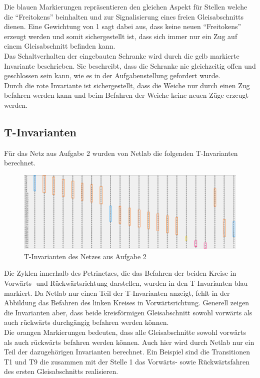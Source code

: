 \documentclass[10pt]{scrartcl}
\begin{document}
Die blauen Markierungen repräsentieren den gleichen Aspekt für Stellen welche die "`Freitokens"' beinhalten und zur Signalisierung eines freien Gleisabschnitts dienen. Eine Gewichtung von 1 sagt dabei aus, dass keine neuen "`Freitokens"' erzeugt werden und somit sichergestellt ist, dass sich immer nur ein Zug auf einem Gleisabschnitt befinden kann.\\

Das Schaltverhalten der eingebauten Schranke wird durch die gelb markierte Invariante beschrieben.
Sie beschreibt, dass die Schranke nie gleichzeitig offen und geschlossen sein kann, wie es in der Aufgabenstellung gefordert wurde.\\

Durch die rote Invariante ist sichergestellt, dass die Weiche nur durch einen Zug befahren werden kann und beim Befahren der Weiche keine neuen Züge erzeugt werden.

\subsection{T-Invarianten}
Für das Netz aus Aufgabe 2 wurden von Netlab die folgenden T-Invarianten berechnet.

\begin{figure}[htbp]
	\centering	\includegraphics[width=1.0\textwidth]{Bilder/t_invarianten.png}
	\caption{T-Invarianten des Netzes aus Aufgabe 2}
	\label{fig:T_invarianten}
\end{figure}

Die Zyklen innerhalb des Petrinetzes, die das Befahren der beiden Kreise in Vorwärts- und Rückwärtsrichtung darstellen, wurden in den T-Invarianten blau markiert.
Da Netlab nur einen Teil der T-Invarianten anzeigt, fehlt in der Abbildung das Befahren des linken Kreises in Vorwärtsrichtung.
Generell zeigen die Invarianten aber, dass beide kreisförmigen Gleisabschnitt sowohl vorwärts als auch rückwärts durchgängig befahren werden können.\\

Die orangen Markierungen bedeuten, dass alle Gleisabschnitte sowohl vorwärts als auch rückwärts befahren werden können.
Auch hier wird durch Netlab nur ein Teil der dazugehörigen Invarianten berechnet. Ein Beispiel sind die Transitionen T1 und T9 die zusammen mit der Stelle 1 das Vorwärts- sowie Rückwärtsfahren des ersten Gleisabschnitts realisieren.\\
\end{document}
